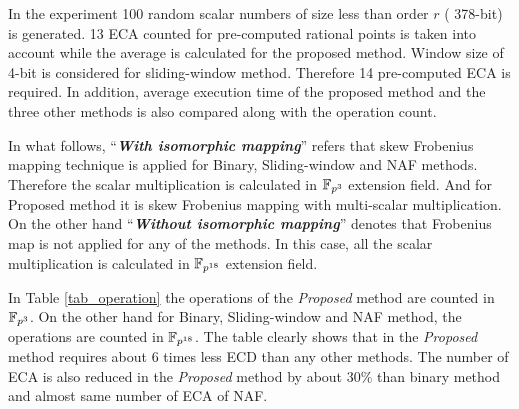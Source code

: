 In the experiment 100 random scalar numbers of size less than order $r$ ( 378-bit) is generated.
13  ECA counted for pre-computed rational points is taken into account while the average is calculated for the proposed method.
Window size of 4-bit is considered for sliding-window method. 
Therefore 14 pre-computed ECA is required. 
In addition, average execution time of the proposed method and the three other methods is also compared along with the operation count.

In what follows, ``\textit{\textbf{With isomorphic mapping}}'' refers that  skew Frobenius mapping technique is applied for Binary, Sliding-window and NAF methods. Therefore the scalar multiplication is calculated in $\mathbb{F}_{p^3}$ extension field.
And for Proposed method it is skew Frobenius mapping with multi-scalar multiplication. 
On the other hand ``\textit{\textbf{Without isomorphic mapping}}'' denotes that Frobenius map is not applied for any of the methods.
In this case, all the scalar multiplication is calculated in $\mathbb{F}_{p^{18}}$ extension field.

\renewcommand{\baselinestretch}{1.5}
\begin{table}[!ht]
\label{tab_operation}
\caption{Comparison of average number of ECA and ECD }
\end{table}
\renewcommand{\baselinestretch}{1.0}
In Table \ref{tab_operation} the operations of the \textit{Proposed} method are counted in $\mathbb{F}_{p^3}$. On the other hand for Binary, Sliding-window and NAF method, the operations are counted in $\mathbb{F}_{p^{18}}$.  The table clearly shows that in the \textit{Proposed} method requires about 6 times less ECD than any other methods.
The number of ECA is also reduced in the \textit{Proposed} method by about 30\% than binary method and almost same number of ECA of NAF. 

